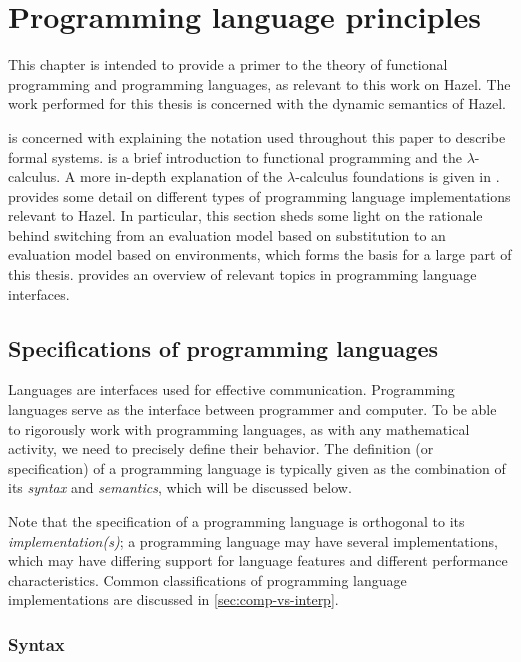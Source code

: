 \chapter{Programming language principles}
\label{sec:prog_lang_principles}

This chapter is intended to provide a primer to the theory of functional programming and programming languages, as relevant to this work on Hazel. The work performed for this thesis is concerned with the dynamic semantics of Hazel.

 is concerned with explaining the notation used throughout this paper to describe formal systems.  is a brief introduction to functional programming and the $\lambda$-calculus. A more in-depth explanation of the $\lambda$-calculus foundations is given in .  provides some detail on different types of programming language implementations relevant to Hazel. In particular, this section sheds some light on the rationale behind switching from an evaluation model based on substitution to an evaluation model based on environments, which forms the basis for a large part of this thesis.  provides an overview of relevant topics in programming language interfaces.

\section{Specifications of programming languages}
\label{sec:prog-lang-def}

Languages are interfaces used for effective communication. Programming languages serve as the interface between programmer and computer.  To be able to rigorously work with programming languages, as with any mathematical activity, we need to precisely define their behavior. The definition (or specification) of a programming language is typically given as the combination of its \textit{syntax} and \textit{semantics}, which will be discussed below.

Note that the specification of a programming language is orthogonal to its \textit{implementation(s)}; a programming language may have several implementations, which may have differing support for language features and different performance characteristics. Common classifications of programming language implementations are discussed in \cref{sec:comp-vs-interp}.

\subsection{Syntax}
\label{sec:syntax}

